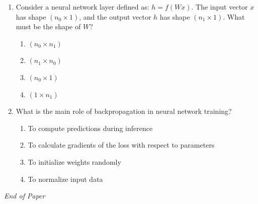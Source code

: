 \documentclass[12pt]{article}
\begin{document}
\begin{enumerate}[label=Q\arabic*.]
\begin{enumerate}[label=(\Alph*)]
    \item Only the input at time $t$
    \item Only the hidden state at time $t-1$
    \item Both the input at time $t$ and the hidden state at time $t-1$
    \item All future inputs
\end{enumerate}
\item Consider a neural network layer defined as: $h = f(Wx)$. The input vector $x$ has shape $(n_0 \times 1)$, and the output vector $h$ has shape $(n_1 \times 1)$. What must be the shape of $W$?
\begin{enumerate}[label=(\Alph*)]
    \item $(n_0 \times n_1)$
    \item $(n_1 \times n_0)$
    \item $(n_0 \times 1)$
    \item $(1 \times n_1)$
\end{enumerate}
\item What is the main role of backpropagation in neural network training?
\begin{enumerate}[label=(\Alph*)]
    \item To compute predictions during inference
    \item To calculate gradients of the loss with respect to parameters
    \item To initialize weights randomly
    \item To normalize input data
\end{enumerate}
\end{enumerate}

\vfill
\noindent\textit{End of Paper}
\end{document}
